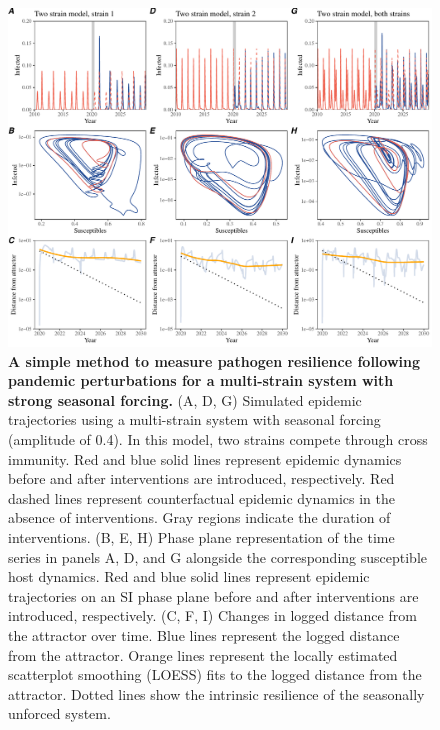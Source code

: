 \documentclass[12pt]{article}
\begin{document}
\begin{figure}[!th]
\includegraphics[width=\textwidth]{../figure2/figure2_multi_strong.pdf}
\caption{
\textbf{A simple method to measure pathogen resilience following pandemic perturbations for a multi-strain system with strong seasonal forcing.}
(A, D, G) Simulated epidemic trajectories using a multi-strain system with seasonal forcing (amplitude of 0.4).
In this model, two strains compete through cross immunity.
Red and blue solid lines represent epidemic dynamics before and after interventions are introduced, respectively.
Red dashed lines represent counterfactual epidemic dynamics in the absence of interventions.
Gray regions indicate the duration of interventions.
(B, E, H) Phase plane representation of the time series in panels A, D, and G alongside the corresponding susceptible host dynamics.
Red and blue solid lines represent epidemic trajectories on an SI phase plane before and after interventions are introduced, respectively.
(C, F, I) Changes in logged distance from the attractor over time.
Blue lines represent the logged distance from the attractor.
Orange lines represent the locally estimated scatterplot smoothing (LOESS) fits to the logged distance from the attractor.
Dotted lines show the intrinsic resilience of the seasonally unforced system.
}
\end{figure}

\pagebreak
\end{document}
